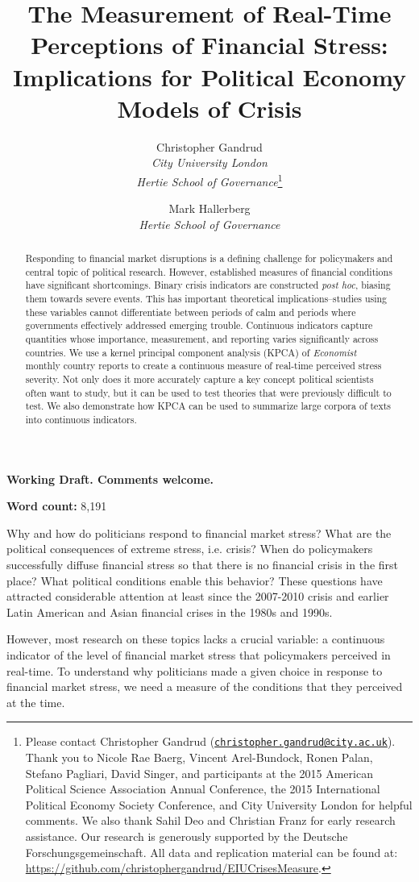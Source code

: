 \documentclass[]{article}
\title{The Measurement of Real-Time Perceptions of Financial Stress: Implications for Political Economy Models of Crisis}
\author{Christopher Gandrud \\ \emph{City University London} \\ \emph{Hertie School of Governance}\footnote{Please contact Christopher Gandrud
(\href{mailto:christopher.gandrud@city.ac.uk}{\nolinkurl{christopher.gandrud@city.ac.uk}}).
Thank you to Nicole Rae Baerg, Vincent Arel-Bundock, Ronen Palan, Stefano Pagliari, David Singer, and participants at the 2015 American Political Science Association Annual Conference, the 2015 International Political Economy Society Conference, and City University London for helpful comments. We also thank Sahil Deo and Christian Franz for early research assistance. Our research is generously supported by the Deutsche Forschungsgemeinschaft. All data and replication material can be found at:
\url{https://github.com/christophergandrud/EIUCrisesMeasure}.}
\and
Mark Hallerberg \\ \emph{Hertie School of Governance}}
\begin{document}
\maketitle

\begin{center}
    \textbf{Working Draft. Comments welcome.}
\end{center}


\begin{abstract}

Responding to financial market disruptions is a defining challenge for policymakers and central topic of political research. However, established measures of financial conditions have significant shortcomings. Binary crisis indicators \cite[e.g.][]{laeven2013} are constructed \emph{post hoc}, biasing them towards severe events. This has important theoretical implications--studies using these variables cannot differentiate between periods of calm and periods where governments effectively addressed emerging trouble. Continuous indicators capture quantities whose importance, measurement, and reporting varies significantly across countries. We use a kernel principal component analysis (KPCA) of \emph{Economist} monthly country reports to create a continuous measure of real-time perceived stress severity. Not only does it more accurately capture a key concept political scientists often want to study, but it can be used to test theories that were previously difficult to test. We also demonstrate how KPCA can be used to summarize large corpora of texts into continuous indicators.

\end{abstract}


\textbf{Word count:} 8,191

\clearpage

Why and how do politicians respond to financial market stress? What are the political consequences of extreme stress, i.e. crisis? When do policymakers successfully diffuse financial stress so that there is no financial crisis in the first place? What political conditions enable this behavior? These questions have attracted considerable attention at least since the 2007-2010 crisis and earlier Latin American and Asian financial crises in the 1980s and 1990s.

However, most research on these topics lacks a crucial variable: a continuous indicator of the level of financial market stress that policymakers perceived in real-time. To understand why politicians made a given choice in response to financial market stress, we need a measure of the conditions that they perceived at the time.
\end{document}
